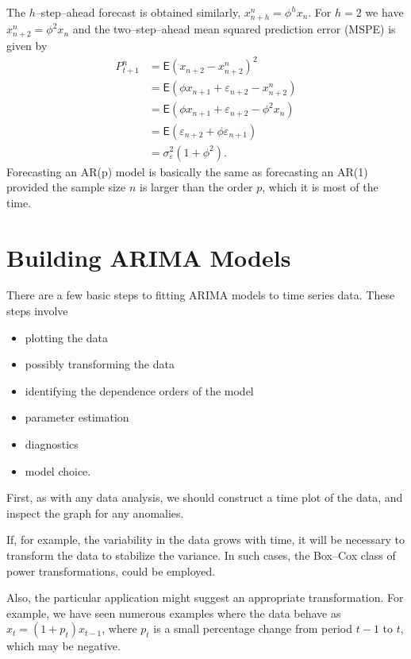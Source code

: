 \documentclass[
paper=128mm:96mm, %
fontsize=9.5pt, %
pagesize, %
parskip=half-, %
]{scrartcl} %
\theoremstyle{mythmstyle} %
\begin{document}
The $h$--step--ahead forecast is obtained similarly, $x_{n+h}^n=\phi^h x_{n}$. For $h=2$ we have $x_{n+2}^n=\phi^2 x_{n}$ and the two--step--ahead mean squared prediction error (MSPE) is given by
%
\begin{align}
P_{t+1}^n&=\mathsf{E}\left(x_{n+2}-x_{n+2}^n\right)^2\nonumber\\
&=\mathsf{E}\left(\phi x_{n+1}+\varepsilon_{n+2}-x_{n+2}^n\right)\nonumber\\
&=\mathsf{E}\left(\phi x_{n+1}+\varepsilon_{n+2}-\phi^2x_n\right)\nonumber\\
&=\mathsf{E}\left(\varepsilon_{n+2}+\phi \varepsilon_{n+1}\right)\nonumber\\
&=\sigma_\varepsilon^2\left(1+\phi^2\right).\nonumber
\end{align}
%
Forecasting an AR(p) model is basically the same as forecasting an AR(1) provided the sample size $n$ is larger than the order $p$, which it is most of the time.
\clearpage

\section{Building ARIMA Models}


There are a few basic steps to fitting ARIMA models to time series data. These steps involve
\begin{itemize}
\item plotting the data
\item possibly transforming the data
\item identifying the dependence orders of the model
\item parameter estimation
\item diagnostics
\item model choice.
\end{itemize}

First, as with any data analysis, we should construct a time plot of the data, and inspect the graph for any anomalies. 

If, for example, the variability in the data grows with time, it will be necessary to transform the data to stabilize the variance. In such cases, the Box--Cox class of power transformations, could be employed. 
  
Also, the particular application might suggest an appropriate transformation. For example, we have seen numerous examples where the data behave as $x_t = (1 + p_t)x_{t-1}$, where $p_t$ is a small percentage change from period $t -1$ to $t$, which may be negative. 
\end{document}
